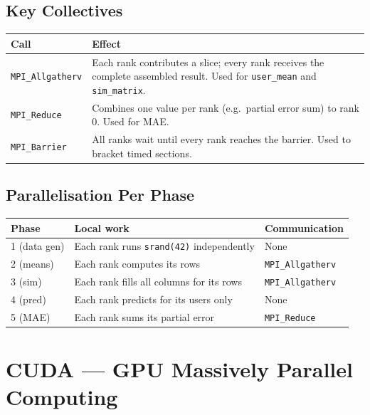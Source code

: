 \documentclass[12pt,a4paper]{report}
\begin{document}
\section{Key Collectives}

\begin{center}
\begin{tabular}{lp{9cm}}
\toprule
Call & Effect \\
\midrule
\texttt{MPI\_Allgatherv} &
  Each rank contributes a slice; every rank receives the complete assembled
  result.  Used for \texttt{user\_mean} and \texttt{sim\_matrix}. \\
\texttt{MPI\_Reduce} &
  Combines one value per rank (e.g.\ partial error sum) to rank 0.
  Used for MAE. \\
\texttt{MPI\_Barrier} &
  All ranks wait until every rank reaches the barrier.
  Used to bracket timed sections. \\
\bottomrule
\end{tabular}
\end{center}

\section{Parallelisation Per Phase}

\begin{center}
\begin{tabular}{lll}
\toprule
Phase & Local work & Communication \\
\midrule
1 (data gen) & Each rank runs \texttt{srand(42)} independently & None \\
2 (means) & Each rank computes its rows & \texttt{MPI\_Allgatherv} \\
3 (sim) & Each rank fills all columns for its rows & \texttt{MPI\_Allgatherv} \\
4 (pred) & Each rank predicts for its users only & None \\
5 (MAE) & Each rank sums its partial error & \texttt{MPI\_Reduce} \\
\bottomrule
\end{tabular}
\end{center}

\chapter{CUDA — GPU Massively Parallel Computing}
\end{document}
